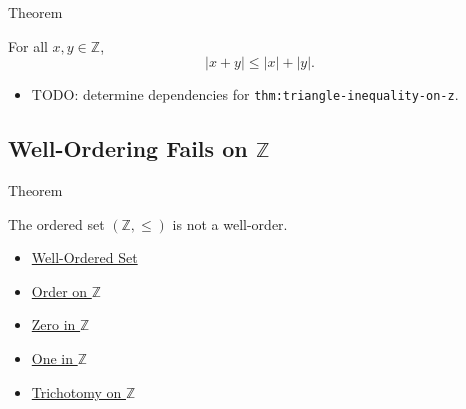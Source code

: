 \begin{theorembox}{Theorem}
\begin{theorem}
\label{thm:triangle-inequality-on-z}
For all $x,y\in\mathbb{Z}$,
\[
|x+y|\le |x|+|y|.
\]
\end{theorem}
\end{theorembox}

\begin{dependencies}
\begin{itemize}
  \item TODO: determine dependencies for \texttt{thm:triangle-inequality-on-z}.
\end{itemize}
\end{dependencies}

\subsection*{Well-Ordering Fails on $\mathbb{Z}$}

\begin{theorembox}{Theorem}
\begin{theorem}
\label{thm:z-is-not-well-ordered}
The ordered set $(\mathbb{Z},\le)$ is not a well-order.
\end{theorem}
\end{theorembox}

\begin{dependencies}
\begin{itemize}
  \item \hyperref[def:well-order]{Well-Ordered Set}
  \item \hyperref[def:order-on-z]{Order on $\mathbb{Z}$}
  \item \hyperref[def:zero-in-z]{Zero in $\mathbb{Z}$}
  \item \hyperref[def:one-in-z]{One in $\mathbb{Z}$}
  \item \hyperref[thm:trichotomy-on-z]{Trichotomy on $\mathbb{Z}$}
\end{itemize}
\end{dependencies}
